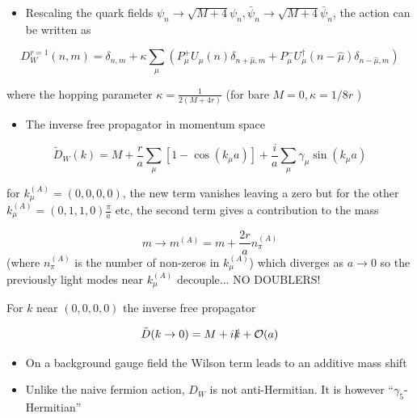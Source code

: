 \begin{itemize}
  \item Rescaling the quark fields \(\psi_{n} \rightarrow \sqrt{M+4} \psi_{n}, \bar{\psi}_{n} \rightarrow \sqrt{M+4} \bar{\psi}_{n}\), the action can be written as
\end{itemize}

\begin{equation}
    \boxed{D_W^{r=1}(n,m) = \delta_{n,m} + \kappa \sum_\mu (P_\mu^+ U_\mu(n)\delta_{n + \hat{\mu}, m} + P_\mu^{-}U^\dagger_\mu(n - \hat{\mu}) \delta_{n - \hat{\mu}, m})}
\end{equation}

where the hopping parameter \(\kappa=\frac{1}{2(M+4 r)}\) (for bare \(M=0, \kappa=1 / 8 r\) )

\begin{itemize}
  \item The inverse free propagator in momentum space
\end{itemize}

\begin{equation}
\widetilde{D}_W(k)=M+\frac{r}{a} \sum_{\mu}\left[1-\cos \left(k_{\mu} a\right)\right]+\frac{i}{a} \sum_{\mu} \gamma_{\mu} \sin \left(k_{\mu} a\right)
\end{equation}

for \(k_{\mu}^{(A)}=(0,0,0,0)\), the new term vanishes leaving a zero but for the other \(k_{\mu}^{(A)}=(0,1,1,0) \frac{\pi}{a}\) etc, the second term gives a contribution to the mass

\begin{equation}
m \rightarrow m^{(A)}=m+\frac{2 r}{a} n_{\pi}^{(A)} 
\end{equation}
(where $n_{\pi}^{(A)}$ is the number of non-zeros in $k_{\mu}^{(A)}$)
which diverges as $a \rightarrow 0$ so the previously light modes near $k_\mu^{(A)}$ decouple... NO DOUBLERS!

For \(k\) near \((0,0,0,0)\) the inverse free propagator

\begin{equation}
\tilde{D}(k \rightarrow 0)=M+i \slashed{k}+\mathcal{O}(a)
\end{equation}

\begin{itemize}
  \item On a background gauge field the Wilson term leads to an additive mass shift
  \item Unlike the naive fermion action, $D_W$ is not anti-Hermitian. It is however ``$\gamma_5$-Hermitian''
\end{itemize}

